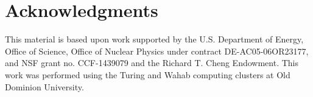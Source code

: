 \documentclass[aps,prl,preprint,12pt]{revtex4}
\begin{document}
\section{Acknowledgments}

This material is based upon work supported by the U.S. Department of Energy, Office of Science, Office of Nuclear 
Physics under contract DE-AC05-06OR23177, and NSF grant no. CCF-1439079 and the Richard T. Cheng Endowment. 
This work was performed using the Turing and  Wahab computing clusters at Old Dominion University.
 
\newpage


\end{document}
